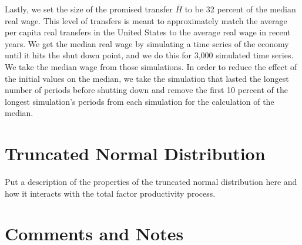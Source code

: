\documentclass[letterpaper,12pt]{article}
\theoremstyle{definition}
\begin{document}
  Lastly, we set the size of the promised transfer $\bar{H}$ to be 32 percent of the median real wage. This level of transfers is meant to approximately match the average per capita real transfers in the United States to the average real wage in recent years. We get the median real wage by simulating a time series of the economy until it hits the shut down point, and we do this for 3,000 simulated time series. We take the median wage from those simulations. In order to reduce the effect of the initial values on the median, we take the simulation that lasted the longest number of periods before shutting down and remove the first 10 percent of the longest simulation's periods from each simulation for the calculation of the median.


\newpage
\setcounter{equation}{0}                         %
\section{Truncated Normal Distribution}\label{SecTAppTrNdist}

  Put a description of the properties of the truncated normal distribution here and how it interacts with the total factor productivity process.


\newpage
\section{Comments and Notes}\label{TAppCommentsNotes}
\end{document}
